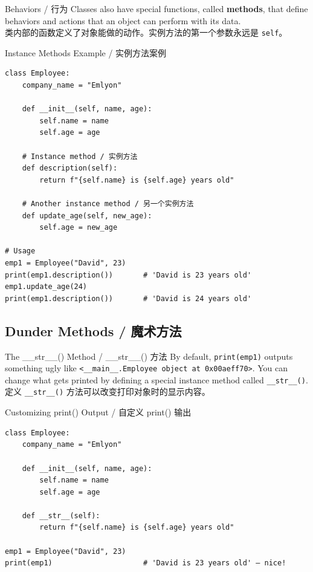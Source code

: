 \documentclass[11pt,a4paper]{report}
\let\oldtexttt\texttt
\renewcommand{\texttt}[1]{\textcolor{mainblue}{\oldtexttt{#1}}}
\begin{document}
\begin{concept}{Behaviors / 行为}
    Classes also have special functions, called \textbf{methods}, that define behaviors and actions that an object can perform with its data. \\
    类内部的函数定义了对象能做的动作。实例方法的第一个参数永远是 \texttt{self}。
\end{concept}

\begin{examplebox}{Instance Methods Example / 实例方法案例}
\begin{lstlisting}
class Employee:
    company_name = "Emlyon"

    def __init__(self, name, age):
        self.name = name
        self.age = age

    # Instance method / 实例方法
    def description(self):
        return f"{self.name} is {self.age} years old"

    # Another instance method / 另一个实例方法
    def update_age(self, new_age):
        self.age = new_age

# Usage
emp1 = Employee("David", 23)
print(emp1.description())       # 'David is 23 years old'
emp1.update_age(24)
print(emp1.description())       # 'David is 24 years old'
\end{lstlisting}
\end{examplebox}

\subsection{Dunder Methods / 魔术方法}

\begin{concept}{The \_\_str\_\_() Method / \_\_str\_\_() 方法}
    By default, \texttt{print(emp1)} outputs something ugly like \texttt{<\_\_main\_\_.Employee object at 0x00aeff70>}. You can change what gets printed by defining a special instance method called \texttt{\_\_str\_\_()}. \\
    定义 \texttt{\_\_str\_\_()} 方法可以改变打印对象时的显示内容。
\end{concept}

\begin{examplebox}{Customizing print() Output / 自定义 print() 输出}
\begin{lstlisting}
class Employee:
    company_name = "Emlyon"

    def __init__(self, name, age):
        self.name = name
        self.age = age

    def __str__(self):
        return f"{self.name} is {self.age} years old"

emp1 = Employee("David", 23)
print(emp1)                     # 'David is 23 years old' — nice!
\end{lstlisting}
\end{examplebox}
\end{document}

